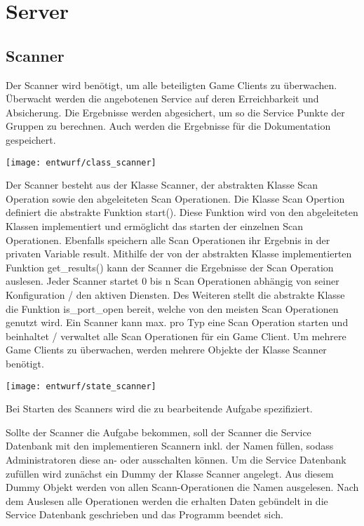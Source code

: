 \section{Server} \label{sec:Server}
\subsection{Scanner} \label{subsec:Scanner}
Der Scanner wird benötigt, um alle beteiligten Game Clients zu überwachen. Überwacht werden die angebotenen Service auf deren Erreichbarkeit und Absicherung. Die Ergebnisse werden abgesichert, um so die Service Punkte der Gruppen zu berechnen. Auch werden die Ergebnisse für die Dokumentation gespeichert.

\begin{center}
	\texttt{[image: entwurf/class\_scanner]}
\end{center}

Der Scanner besteht aus der Klasse Scanner, der abstrakten Klasse Scan Operation sowie den abgeleiteten Scan Operationen. Die Klasse Scan Opertion definiert die abstrakte Funktion start(). Diese Funktion wird von den abgeleiteten Klassen implementiert und ermöglicht das starten der einzelnen Scan Operationen. Ebenfalls speichern alle Scan Operationen ihr Ergebnis in der privaten Variable result. Mithilfe der von der abstrakten Klasse implementierten Funktion get\_results() kann der Scanner die Ergebnisse der Scan Operation auslesen. Jeder Scanner startet 0 bis n Scan Operationen abhängig von seiner Konfiguration / den aktiven Diensten. Des Weiteren stellt die abstrakte Klasse die Funktion is\_port\_open bereit, welche von den meisten Scan Operationen genutzt wird. Ein Scanner kann max. pro Typ eine Scan Operation starten und beinhaltet / verwaltet alle Scan Operationen für ein Game Client. Um mehrere Game Clients zu überwachen, werden mehrere Objekte der Klasse Scanner benötigt.

\texttt{[image: entwurf/state\_scanner]}

Bei Starten des Scanners wird die zu bearbeitende Aufgabe spezifiziert.

Sollte der Scanner die Aufgabe  bekommen, soll der Scanner die Service Datenbank mit den implementieren Scannern inkl. der Namen füllen, sodass Administratoren diese an- oder ausschalten können.
Um die Service Datenbank zufüllen wird zunächst ein Dummy der Klasse Scanner angelegt. Aus diesem Dummy Objekt werden von allen Scann-Operationen die Namen ausgelesen. Nach dem Auslesen alle Operationen werden die erhalten Daten gebündelt in die Service Datenbank geschrieben und das Programm beendet sich.

